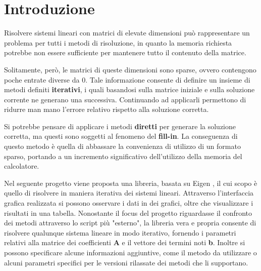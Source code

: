 \section{Introduzione}

Risolvere sistemi lineari con matrici di elevate dimensioni può rappresentare un problema per tutti i metodi di risoluzione, in quanto la memoria richiesta potrebbe non essere sufficiente per mantenere tutto il contenuto della matrice.

 Solitamente, però, le matrici di queste dimensioni sono sparse, ovvero contengono poche entrate diverse da 0. Tale informazione consente di definire un insieme di metodi definiti \textbf{iterativi}, i quali basandosi sulla matrice iniziale e sulla soluzione corrente ne generano una successiva. Continuando ad applicarli permettono di ridurre man mano l'errore relativo rispetto alla soluzione corretta.
 
 Si potrebbe pensare di applicare i metodi \textbf{diretti} per generare la soluzione corretta, ma questi sono soggetti al fenomeno del \textbf{fill-in}. La conseguenza di questo metodo è quella di abbassare la convenienza di utilizzo di un formato sparso, portando a un incremento significativo dell'utilizzo della memoria del calcolatore.
 
 Nel seguente progetto viene proposta una libreria, basata su Eigen \cite{Eigen} , il cui scopo è quello di risolvere in maniera iterativa dei sistemi lineari. Attraverso l'interfaccia grafica realizzata si possono osservare i dati in dei grafici, oltre che visualizzare i risultati in una tabella. Nonostante il focus del progetto riguardasse il confronto dei metodi attraverso lo script più "esterno", la libreria vera e propria consente di risolvere qualunque sistema lineare in modo iterativo, fornendo i parametri relativi alla matrice dei coefficienti \textbf{A} e il vettore dei termini noti \textbf{b}. Inoltre si possono specificare alcune informazioni aggiuntive, come il metodo da utilizzare o alcuni parametri specifici per le versioni rilassate dei metodi che li supportano.
 
 
 